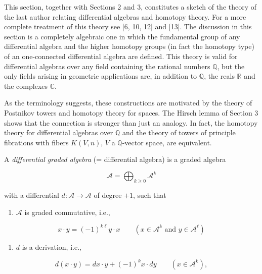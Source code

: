 \documentclass[
  english,
  a3paper,
  a3paper]{extarticle}
\providecommand{\tightlist}{%
  \setlength{\itemsep}{0pt}\setlength{\parskip}{0pt}}
\begin{document}
This section, together with Sections 2 and 3, constitutes a sketch of
the theory of the last author relating differential algebras and
homotopy theory. For a more complete treatment of this theory see {[}6,
10, 12{]} and {[}13{]}. The discussion in this section is a completely
algebraic one in which the fundamental group of any differential algebra
and the higher homotopy groups (in fact the homotopy type) of an
one-connected differential algebra are defined. This theory is valid for
differential algebras over any field containing the rational numbers
\(\mathbb Q\), but the only fields arising in geometric applications
are, in addition to \(\mathbb Q\), the reals \(\mathbb R\) and the
complexes \(\mathbb C\).

As the terminology suggests, these constructions are motivated by the
theory of Postnikov towers and homotopy theory for spaces. The Hirsch
lemma of Section 3 shows that the connection is stronger than just an
analogy. In fact, the homotopy theory for differential algebras over
\(\mathbb Q\) and the theory of towers of principle fibrations with
fibers \(K(V,n)\), \(V\) a \(\mathbb Q\)-vector space, are equivalent.

A \emph{differential graded algebra} (= differential algebra) is a
graded algebra

\[
\mathscr A=\bigoplus_{k\ge0}\mathscr A^k
\]

with a differential \(d:\mathscr A\to\mathscr A\) of degree \(+1\), such
that

\begin{enumerate}
\def\labelenumi{\arabic{enumi})}
\tightlist
\item
  \(\mathscr A\) is graded commutative, i.e.,
\end{enumerate}

\[
x\cdot y=(-1)^{k\ell}y\cdot x\qquad(x\in\mathscr A^k\text{ and }y\in\mathscr A^\ell)
\]

\begin{enumerate}
\def\labelenumi{\arabic{enumi})}
\setcounter{enumi}{1}
\tightlist
\item
  \(d\) is a derivation, i.e.,
\end{enumerate}

\[
d(x\cdot y)=dx\cdot y+(-1)^k x\cdot dy\qquad(x\in\mathscr A^k),
\]

\clearpage


\end{document}
